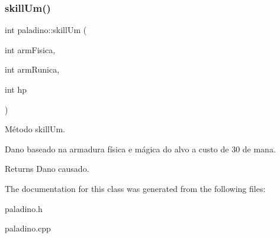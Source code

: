 \subsubsection{\texorpdfstring{skill\+Um()}{skillUm()}}
{\footnotesize\ttfamily int paladino\+::skill\+Um (\begin{DoxyParamCaption}\item[{int}]{arm\+Fisica,  }\item[{int}]{arm\+Runica,  }\item[{int}]{hp }\end{DoxyParamCaption})}



Método skill\+Um. 

Dano baseado na armadura física e mágica do alvo a custo de 30 de mana. \begin{DoxyReturn}{Returns}
Dano causado. 
\end{DoxyReturn}


The documentation for this class was generated from the following files\+:\begin{DoxyCompactItemize}
\item 
paladino.\+h\item 
paladino.\+cpp\end{DoxyCompactItemize}
